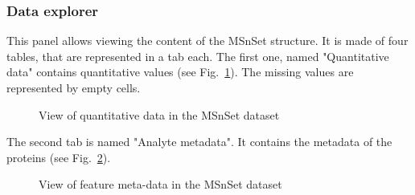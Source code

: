 \documentclass[12pt]{article}
\begin{document}
\subsubsection {Data explorer}\label{sec:dataexplorer}
This panel allows viewing the content of the MSnSet structure. It is made of 
four tables, that are represented in a tab each. 
The first one, named "Quantitative data" contains quantitative values 
(see Fig.~\ref{fig:sdqv1}). The missing values are represented by empty cells.

\begin {figure}
\centering
{}
\caption{View of quantitative data in the MSnSet dataset}\label{fig:sdqv1}
\end {figure}


The second tab is named "Analyte metadata". It contains the metadata of the 
proteins (see Fig.~\ref{fig:sdqv2}).

\begin {figure}
\centering
{}
\caption{View of feature meta-data in the MSnSet dataset}\label{fig:sdqv2}
\end {figure}
\end{document}
